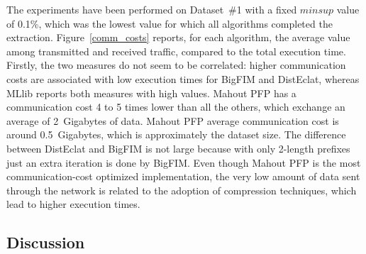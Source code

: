 The experiments have been performed on Dataset~\#1 with a fixed $minsup$ value of 0.1\%,
which was the lowest value for which all algorithms completed the extraction.
Figure~\ref{comm_costs} reports, for each algorithm, the average value
among transmitted and received traffic, compared to the total execution time.
Firstly, the two measures do not seem to be correlated:
higher communication costs are associated with low execution times
for BigFIM and DistEclat, whereas MLlib reports both measures with high values.
Mahout PFP has a communication cost 4 to 5 times lower than all the others,
which exchange an average of 2~Gigabytes of data.
Mahout PFP average communication cost is around 0.5~Gigabytes,
which is approximately the dataset size.
The difference between DistEclat and BigFIM is not large because with only 2-length prefixes just an extra iteration is done by BigFIM.
Even though Mahout PFP is the most communication-cost optimized implementation,
the very low amount of data sent through the network is related
to the adoption of compression techniques, which lead to higher execution times.




\subsection{Discussion}

